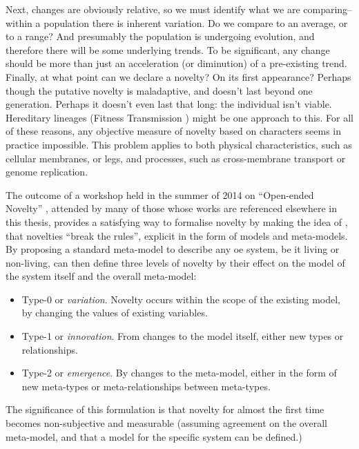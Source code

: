 Next, changes are obviously relative, so we must identify what we are comparing--within a population there is inherent variation. Do we compare to an average, or to a range? And presumably the population is undergoing evolution, and therefore there will be some underlying trends. To be significant, any change should be more than just an acceleration (or diminution) of a pre-existing trend. Finally, at what point can we declare a novelty? On its first appearance? Perhaps though the putative novelty is maladaptive, and doesn't last beyond one generation. Perhaps it doesn't even last that long: the individual isn't viable. Hereditary lineages (\eg Fitness Transmission \parencite{Miconi:2007xh}) might be one approach to this. For all of these reasons, any objective measure of novelty based on characters seems in practice impossible. This problem applies to both physical characteristics, such as cellular membranes, or legs, and processes, such as cross-membrane transport or genome replication.

The outcome of a workshop held in the summer of 2014 on ``Open-ended Novelty'' \parencite{BanzhafBaumgaertnerBeslonEtAl2016} , attended by many of those whose works are referenced elsewhere in this thesis, provides a satisfying way to formalise novelty by making the idea of \textcite{Boden2004}, that novelties ``break the rules'', explicit in the form of models and meta-models. By proposing a standard meta-model to describe any \gls{oe} system, be it living or non-living, \textcite{BanzhafBaumgaertnerBeslonEtAl2016} can then define three levels of novelty by their effect on the model of the system itself and the overall meta-model:

\begin{itemize}
	\item Type-0 or \emph{variation}. Novelty occurs within the scope of the existing model, by changing the values of existing variables.
	\item Type-1 or \emph{innovation}. From changes to the model itself, either new types or relationships.
	\item Type-2 or \emph{emergence}. By changes to the meta-model, either in the form of new meta-types or meta-relationships between meta-types.
\end{itemize}

The significance of this formulation is that novelty for almost the first time becomes non-subjective and measurable (assuming agreement on the overall meta-model, and that a model for the specific system can be defined.)

